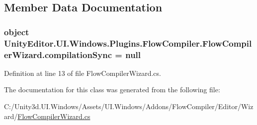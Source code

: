 \subsection{Member Data Documentation}
\hypertarget{class_unity_editor_1_1_u_i_1_1_windows_1_1_plugins_1_1_flow_compiler_1_1_flow_compiler_wizard_a0ad2ea20cd3d641cf5853544c99b9288}{}
\subsubsection[{compilation\+Sync}]{\setlength{\rightskip}{0pt plus 5cm}object Unity\+Editor.\+U\+I.\+Windows.\+Plugins.\+Flow\+Compiler.\+Flow\+Compiler\+Wizard.\+compilation\+Sync = null\hspace{0.3cm}{\ttfamily [static]}}\label{class_unity_editor_1_1_u_i_1_1_windows_1_1_plugins_1_1_flow_compiler_1_1_flow_compiler_wizard_a0ad2ea20cd3d641cf5853544c99b9288}


Definition at line 13 of file Flow\+Compiler\+Wizard.\+cs.



The documentation for this class was generated from the following file\+:\begin{DoxyCompactItemize}
\item 
C\+:/\+Unity3d.\+U\+I.\+Windows/\+Assets/\+U\+I.\+Windows/\+Addons/\+Flow\+Compiler/\+Editor/\+Wizard/\hyperlink{_flow_compiler_wizard_8cs}{Flow\+Compiler\+Wizard.\+cs}\end{DoxyCompactItemize}
